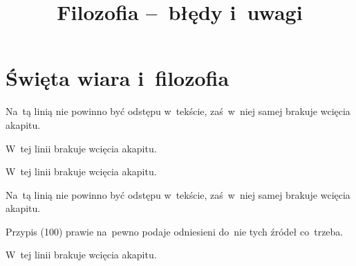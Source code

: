 \documentclass[a4paper,11pt]{article}
\title{Filozofia --~błędy i~uwagi}
\begin{document}



\maketitle  %



\section{Święta wiara i~filozofia}

\vspace{\spaceTwo}



\newpage
{}



\start {} Na~tą linią nie powinno być odstępu w~tekście,
zaś~w~niej samej brakuje wcięcia akapitu.

\vspace{\spaceFour}


\start {} W~tej linii brakuje wcięcia akapitu.

\vspace{\spaceFour}


\start {} W~tej linii brakuje wcięcia akapitu.

\vspace{\spaceFour}


\start {} Na~tą linią nie powinno być odstępu w~tekście,
zaś~w~niej samej brakuje wcięcia akapitu.

\vspace{\spaceFour}


\start {} Przypis (100) prawie na~pewno podaje odniesieni
do~nie tych źródeł co~trzeba.

\vspace{\spaceFour}


\start {} W~tej linii brakuje wcięcia akapitu.

\vspace{\spaceFour}
\end{document}
